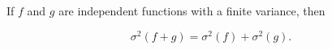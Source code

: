 If $f$ and $g$ are independent functions with a finite variance, then

$$\sigma^2(f + g) = \sigma^2(f) + \sigma^2(g).$$
